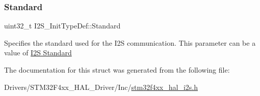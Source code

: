 \subsubsection{\texorpdfstring{Standard}{Standard}}
{\footnotesize\ttfamily uint32\+\_\+t I2\+S\+\_\+\+Init\+Type\+Def\+::\+Standard}

Specifies the standard used for the I2S communication. This parameter can be a value of \hyperlink{group___i2_s___standard}{I2S Standard} 

The documentation for this struct was generated from the following file\+:\begin{DoxyCompactItemize}
\item 
Drivers/\+S\+T\+M32\+F4xx\+\_\+\+H\+A\+L\+\_\+\+Driver/\+Inc/\hyperlink{stm32f4xx__hal__i2s_8h}{stm32f4xx\+\_\+hal\+\_\+i2s.\+h}\end{DoxyCompactItemize}
